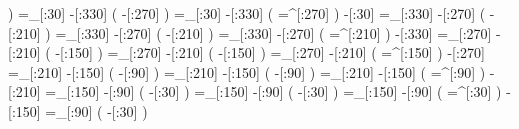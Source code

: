                )
     =_[:30]%
     -[:330]%
               (
         -[:270]%
               )
     =_[:30]%
     -[:330]%
               (
        =^[:270]%
               )
      -[:30]%
    =_[:330]%
     -[:270]%
               (
         -[:210]%
               )
    =_[:330]%
     -[:270]%
               (
         -[:210]%
               )
    =_[:330]%
     -[:270]%
               (
        =^[:210]%
               )
     -[:330]%
    =_[:270]%
     -[:210]%
               (
         -[:150]%
               )
    =_[:270]%
     -[:210]%
               (
         -[:150]%
               )
    =_[:270]%
     -[:210]%
               (
        =^[:150]%
               )
     -[:270]%
    =_[:210]%
     -[:150]%
               (
          -[:90]%
               )
    =_[:210]%
     -[:150]%
               (
          -[:90]%
               )
    =_[:210]%
     -[:150]%
               (
         =^[:90]%
               )
     -[:210]%
    =_[:150]%
      -[:90]%
               (
          -[:30]%
               )
    =_[:150]%
      -[:90]%
               (
          -[:30]%
               )
    =_[:150]%
      -[:90]%
               (
         =^[:30]%
               )
     -[:150]%
     =_[:90]%
               (
          -[:30]%
               )